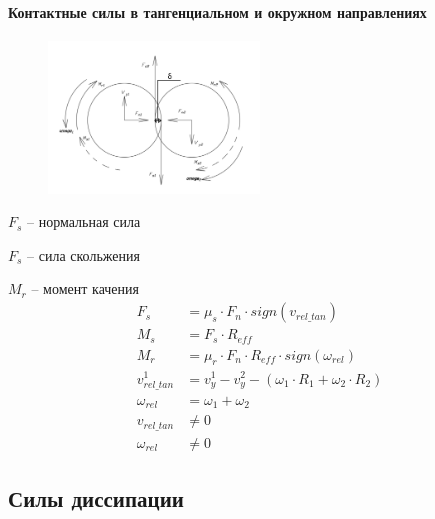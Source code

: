 \documentclass[c]{beamer}  %
\begin{document}
\begin{frame}
\frametitle{\insertsection} 
\framesubtitle{Контактные силы в тангенциальном и окружном направлениях}
\begin{figure}
\includegraphics[width=0.5\textwidth]{sily}
\end{figure}
$F_s$ -- нормальная сила

$F_s$ -- сила скольжения

$M_r$ -- момент качения
\begin{align*}
F_s &= \mu_s \cdot F_n \cdot sign(v_{rel\_tan})\\
M_s &= F_s \cdot R_{eff}\\
M_r &= \mu_r \cdot F_n \cdot R_{eff} \cdot sign(\omega_{rel})\\
v_{rel\_tan}^{1} &= v_{y}^{1} - v_{y}^{2} - \left( \omega_1 \cdot R_1 + \omega_2 \cdot R_2 \right)\\
\omega_{rel} &= \omega_1 + \omega_2\\
v_{rel\_tan} &\neq 0\\
\omega_{rel} &\neq 0
\end{align*}
\end{frame}







\subsection{Силы диссипации}
\end{document}
